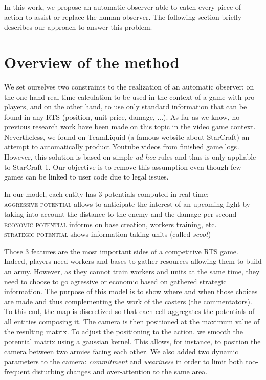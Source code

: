 \documentclass{jfsma}
\begin{document}
    In this work, we propose an automatic observer able to catch every piece of action to assist or replace the human observer. The following section briefly describes our approach to answer this problem.

\section{Overview of the method}
We set ourselves two constraints to the realization of an automatic observer: on the one hand real time calculation to be used in the context of a game with pro players, and on the other hand, to use only standard information that can be found in any RTS (position, unit price, damage, ...).
As far as we know, no previous research work have been made on this topic in the video game context.
Nevertheless, we found on TeamLiquid (a famous website about StarCraft) an attempt to automatically product Youtube videos from finished game logs\,\cite{tl}.
However, this solution is based on simple \emph{ad-hoc} rules and thus is only appliable to StarCraft 1.
Our objective is to remove this assumption even though few games can be linked to user code due to legal issues.

In our model, each entity has 3 potentials computed in real time:\\
\textsc{aggressive potential} allows to anticipate the interest of an upcoming fight by taking into account the distance to the enemy and the damage per second\\
\textsc{economic potential} informs on base creation, workers training, etc.\\
\textsc{strategic potential} shows information-taking units (called \emph{scoot})

Those 3 features are the most important sides of a competitive RTS game.
Indeed, players need workers and bases to gather resources allowing them to build an army.
However, as they cannot train workers and units at the same time, they need to choose to go agressive or economic based on gathered strategic information.
The purpose of this model is to show where and when those choices are made and thus complementing the work of the casters (the commentators).
To this end, the map is discretized so that each cell aggregates the potentials of all entities composing it.
The camera is then positioned at the maximum value of the resulting matrix.
To adjust the positioning to the action, we smooth the potential matrix using a gaussian kernel.
This allows, for instance, to position the camera between two armies facing each other.
We also added two dynamic parameters to the camera: \emph{commitment} and \emph{weariness} in order to limit both too-frequent disturbing changes and over-attention to the same area.
\end{document}
